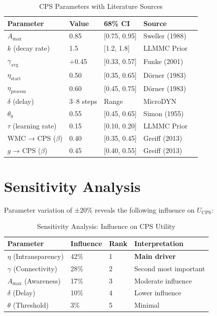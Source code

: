 \begin{table}[htbp]
\centering
\caption{CPS Parameters with Literature Sources}
\label{tab:cps-parameters}
\begin{tabular}{lllll}
\toprule
\textbf{Parameter} & \textbf{Value} & \textbf{68\% CI} & \textbf{Source} \\
\midrule
$A_{\max}$ & 0.85 & [0.75, 0.95] & Sweller (1988) \\
$k$ (decay rate) & 1.5 & [1.2, 1.8] & LLMMC Prior \\
$\gamma_{\text{avg}}$ & +0.45 & [0.33, 0.57] & Funke (2001) \\
$\eta_{\text{start}}$ & 0.50 & [0.35, 0.65] & Dörner (1983) \\
$\eta_{\text{process}}$ & 0.60 & [0.45, 0.75] & Dörner (1983) \\
$\delta$ (delay) & 3--8 steps & Range & MicroDYN \\
$\theta_0$ & 0.55 & [0.45, 0.65] & Simon (1955) \\
$\tau$ (learning rate) & 0.15 & [0.10, 0.20] & LLMMC Prior \\
WMC → CPS ($\beta$) & 0.40 & [0.35, 0.45] & Greiff (2013) \\
$g$ → CPS ($\beta$) & 0.45 & [0.40, 0.55] & Greiff (2013) \\
\bottomrule
\end{tabular}
\end{table}



\section{Sensitivity Analysis}
\label{sec:cps-sensitivity}

Parameter variation of ±20\% reveals the following influence on $U_{\text{CPS}}$:

\begin{table}[htbp]
\centering
\caption{Sensitivity Analysis: Influence on CPS Utility}
\label{tab:cps-sensitivity}
\begin{tabular}{llll}
\toprule
\textbf{Parameter} & \textbf{Influence} & \textbf{Rank} & \textbf{Interpretation} \\
\midrule
$\eta$ (Intransparency) & 42\% & 1 & \textbf{Main driver} \\
$\gamma$ (Connectivity) & 28\% & 2 & Second most important \\
$A_{\max}$ (Awareness) & 17\% & 3 & Moderate influence \\
$\delta$ (Delay) & 10\% & 4 & Lower influence \\
$\theta$ (Threshold) & 3\% & 5 & Minimal \\
\bottomrule
\end{tabular}
\end{table}

